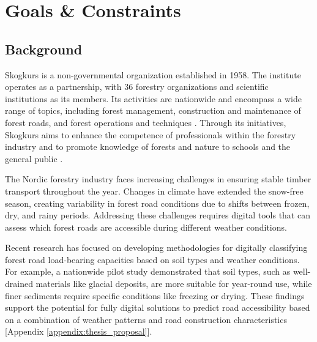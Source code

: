 \section{Goals \& Constraints}
\subsection{Background}
Skogkurs is a non-governmental organization established in 1958. The institute operates as a partnership, with 36 forestry organizations and scientific institutions as its members. Its activities are nationwide and encompass a wide range of topics, including forest management, construction and maintenance of forest roads, and forest operations and techniques \cite{skogkurs_eng}. Through its initiatives, Skogkurs aims to enhance the competence of professionals within the forestry industry and to promote knowledge of forests and nature to schools and the general public \cite{skogkurs_nor}. 

The Nordic forestry industry faces increasing challenges in ensuring stable timber transport throughout the year. Changes in climate have extended the snow-free season, creating variability in forest road conditions due to shifts between frozen, dry, and rainy periods. Addressing these challenges requires digital tools that can assess which forest roads are accessible during different weather conditions.

Recent research has focused on developing methodologies for digitally classifying forest road load-bearing capacities based on soil types and weather conditions. For example, a nationwide pilot study demonstrated that soil types, such as well-drained materials like glacial deposits, are more suitable for year-round use, while finer sediments require specific conditions like freezing or drying. These findings support the potential for fully digital solutions to predict road accessibility based on a combination of weather patterns and road construction characteristics [Appendix \ref{appendix:thesis_proposal}].

\begin{comment}
    Additionally, tools like HarvesterSeasons.com, developed by the Finnish Meteorological Institute, provide weekly forecasts of road conditions based on soil moisture, temperature, and snow depth. These forecasts use data from sources like NASA's SMAP and ESA's Sentinel-1 satellites to generate relative load-bearing predictions for winter and snow-free seasons. Such advancements aim to increase efficiency and reduce risks in forest operations under variable weather conditions [\ref{appendix:thesis_proposal}.
\end{comment}

